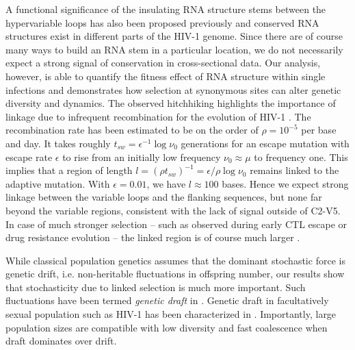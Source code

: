 \documentclass[10pt]{article}
\newcommand{\shankaregion}{C2-V5}
\begin{document}
A functional significance of the insulating RNA structure stems between the
hypervariable loops has also been proposed previously
\cite{watts_architecture_2009, sanjuan_interplay_2011} and conserved RNA
structures exist in different parts of the HIV-1 genome. Since there are
of course many ways to build an RNA stem in a particular location, we do
not necessarily expect a strong signal of conservation in cross-sectional data. 
Our analysis, however, is able to
quantify the fitness effect of RNA structure within single infections and
demonstrates how selection at synonymous sites can alter genetic diversity and
dynamics. The observed hitchhiking highlights the importance of linkage due to
infrequent recombination for the evolution of HIV-1
\cite{neher_recombination_2010, batorsky_estimate_2011,
josefsson_majority_2011}. The recombination rate has been estimated to be on the
order of $\rho = 10^{-5}$ per base and day. It takes roughly $t_{sw} =
\epsilon^{-1} \log \nu_0$ generations for an escape mutation with escape rate
$\epsilon$ to rise from an initially low frequency $\nu_0\approx \mu$ to frequency
one. This implies that a region of length $l = (\rho t_{sw})^{-1} = \epsilon /
\rho \log \nu_0$ remains linked to the adaptive mutation. With $\epsilon=0.01$,
we have $l\approx 100$ bases. Hence we expect strong linkage between the
variable loops and the flanking sequences, but none far beyond the variable
regions, consistent with the lack of signal outside of \shankaregion. In case of
much stronger selection -- such as observed during early CTL escape or drug
resistance evolution -- the linked region is of course much larger
\cite{nijhuis_stochastic_1998}. 

While classical population genetics assumes that the dominant stochastic force
is genetic drift, i.e. non-heritable fluctuations in offspring number, our
results show that stochasticity due to linked selection is much more important.
Such fluctuations have been termed \emph{genetic draft} in
\cite{gillespie_genetic_2000}. Genetic draft in facultatively sexual population
such as HIV-1 has been characterized in \cite{neher_genetic_2011}. Importantly,
large population sizes are compatible with low diversity and fast coalescence
when draft dominates over drift.
\end{document}
